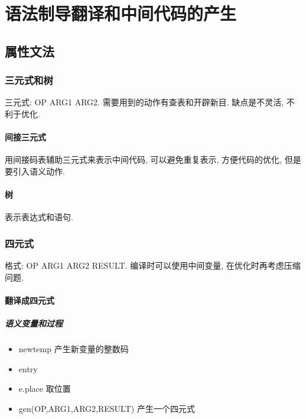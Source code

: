 \chapter{语法制导翻译和中间代码的产生}

    \section{属性文法}

        \subsection{三元式和树}

            三元式: OP ARG1 ARG2. 需要用到的动作有查表和开辟新目. 缺点是不灵活, 不利于优化.

            \subsubsection{间接三元式}

                用间接码表辅助三元式来表示中间代码, 可以避免重复表示, 方便代码的优化, 但是要引入语义动作.

            \subsubsection{树}

                表示表达式和语句.

        \subsection{四元式}

            格式: OP ARG1 ARG2 RESULT. 编译时可以使用中间变量, 在优化时再考虑压缩问题.

            \subsubsection{翻译成四元式}

                \paragraph{语义变量和过程}
                \begin{itemize}
                    \item newtemp 产生新变量的整数码
                    \item entry
                    \item e.place 取位置
                    \item gen(OP,ARG1,ARG2,RESULT) 产生一个四元式
                \end{itemize}

